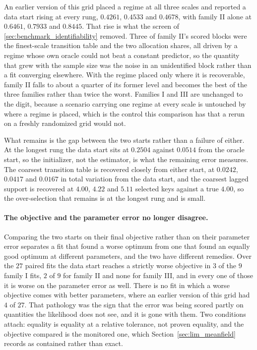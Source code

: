 An earlier version of this grid placed a regime at all three scales and reported
a data start rising at every rung, $0.4261$, $0.4533$ and $0.4678$, with family
II alone at $0.6461$, $0.7933$ and $0.8445$. That rise is what the screen of
\cref{sec:benchmark_identifiability} removed. Three of family II's scored blocks
were the finest-scale transition table and the two allocation shares, all driven
by a regime whose own oracle could not beat a constant predictor, so the quantity
that grew with the sample size was the noise in an unidentified block rather than
a fit converging elsewhere. With the regime placed only where it is recoverable,
family II falls to about a quarter of its former level and becomes the best of
the three families rather than twice the worst. Families I and III are unchanged
to the digit, because a scenario carrying one regime at every scale is untouched
by where a regime is placed, which is the control this comparison has that a
rerun on a freshly randomized grid would not.

What remains is the gap between the two starts rather than a failure of either.
At the longest rung the data start sits at $0.2504$ against $0.0514$ from the
oracle start, so the initializer, not the estimator, is what the remaining error
measures. The coarsest transition table is recovered closely from either start,
at $0.0242$, $0.0417$ and $0.0167$ in total variation from the data start, and
the coarsest lagged support is recovered at $4.00$, $4.22$ and $5.11$ selected
keys against a true $4.00$, so the over-selection that remains is at the longest
rung and is small.

\paragraph{The objective and the parameter error no longer disagree.}
Comparing the two starts on their final objective rather than on their parameter
error separates a fit that found a worse optimum from one that found an equally
good optimum at different parameters, and the two have different remedies. Over
the $27$ paired fits the data start reaches a strictly worse objective in $3$ of
the $9$ family I fits, $2$ of $9$ for family II and none for family III, and in
every one of those it is worse on the parameter error as well. There is no fit
in which a worse objective comes with better parameters, where an earlier version
of this grid had $4$ of $27$. That pathology was the sign that the error was
being scored partly on quantities the likelihood does not see, and it is gone
with them. Two conditions attach: equality is equality at a relative tolerance,
not proven equality, and the objective compared is the monitored one, which
Section~\ref{sec:lim_meanfield} records as contained rather than exact.

